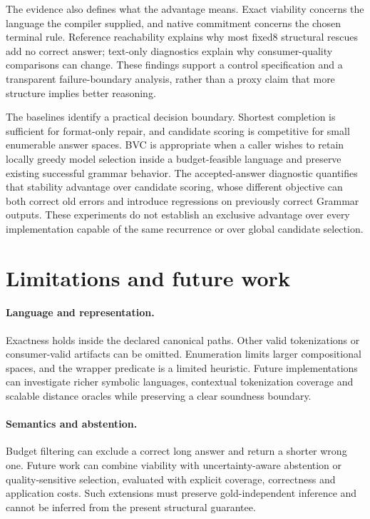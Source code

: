 \documentclass[12pt,a4paper]{article}
\begin{document}
The evidence also defines what the advantage means. Exact viability concerns the language the compiler supplied, and native commitment concerns the chosen terminal rule. Reference reachability explains why most fixed8 structural rescues add no correct answer; text-only diagnostics explain why consumer-quality comparisons can change. These findings support a control specification and a transparent failure-boundary analysis, rather than a proxy claim that more structure implies better reasoning.

The baselines identify a practical decision boundary. Shortest completion is sufficient for format-only repair, and candidate scoring is competitive for small enumerable answer spaces. BVC is appropriate when a caller wishes to retain locally greedy model selection inside a budget-feasible language and preserve existing successful grammar behavior. The accepted-answer diagnostic quantifies that stability advantage over candidate scoring, whose different objective can both correct old errors and introduce regressions on previously correct Grammar outputs. These experiments do not establish an exclusive advantage over every implementation capable of the same recurrence or over global candidate selection.

\section{Limitations and future work}\label{sec:future}
\paragraph{Language and representation.} Exactness holds inside the declared canonical paths. Other valid tokenizations or consumer-valid artifacts can be omitted. Enumeration limits larger compositional spaces, and the wrapper predicate is a limited heuristic. Future implementations can investigate richer symbolic languages, contextual tokenization coverage and scalable distance oracles while preserving a clear soundness boundary.

\paragraph{Semantics and abstention.} Budget filtering can exclude a correct long answer and return a shorter wrong one. Future work can combine viability with uncertainty-aware abstention or quality-sensitive selection, evaluated with explicit coverage, correctness and application costs. Such extensions must preserve gold-independent inference and cannot be inferred from the present structural guarantee.
\end{document}
